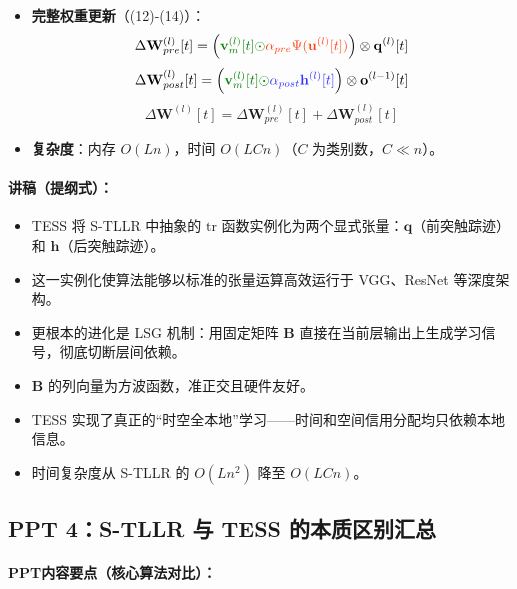 \documentclass[journal,12pt,onecolumn]{IEEEtran}
\begin{document}
\begin{itemize}
    \item \textbf{完整权重更新}（\cite{apolinario_tess_2025}(12)-(14)）：
    \[
    \Delta \mathbf{W}_{pre}^{(l)}[t] = \left( {\color{mygreen}\mathbf{v}_m^{(l)}[t] \odot} {\color{myred}\alpha_{pre}\Psi(\mathbf{u}^{(l)}[t])} \right) \otimes \mathbf{q}^{(l)}[t]
    \]
    \[
    \Delta \mathbf{W}_{post}^{(l)}[t] = \left( {\color{mygreen}\mathbf{v}_m^{(l)}[t] \odot} {\color{myblue}\alpha_{post}\mathbf{h}^{(l)}[t]} \right) \otimes \mathbf{o}^{(l-1)}[t]
    \]
    \[
    \Delta \mathbf{W}^{(l)}[t] = \Delta \mathbf{W}_{pre}^{(l)}[t] + \Delta \mathbf{W}_{post}^{(l)}[t]
    \]
    
    \item \textbf{复杂度}：内存 \(O(Ln)\)，时间 \(O(LCn)\)（\(C\) 为类别数，\(C \ll n\)）。
\end{itemize}

\paragraph{\textbf{讲稿（提纲式）：}}
\begin{itemize}
    \item TESS 将 S-TLLR 中抽象的 \(\text{tr}\) 函数实例化为两个显式张量：\(\mathbf{q}\)（前突触踪迹）和 \(\mathbf{h}\)（后突触踪迹）。
    \item 这一实例化使算法能够以标准的张量运算高效运行于 VGG、ResNet 等深度架构。
    \item 更根本的进化是 LSG 机制：用固定矩阵 \(\mathbf{B}\) 直接在当前层输出上生成学习信号，彻底切断层间依赖。
    \item \(\mathbf{B}\) 的列向量为方波函数，准正交且硬件友好。
    \item TESS 实现了真正的“时空全本地”学习——时间和空间信用分配均只依赖本地信息。
    \item 时间复杂度从 S-TLLR 的 \(O(Ln^2)\) 降至 \(O(LCn)\)。
\end{itemize}

\subsection*{PPT 4：S-TLLR 与 TESS 的本质区别汇总}

\paragraph{\textbf{PPT内容要点（核心算法对比）：}}
\end{document}
